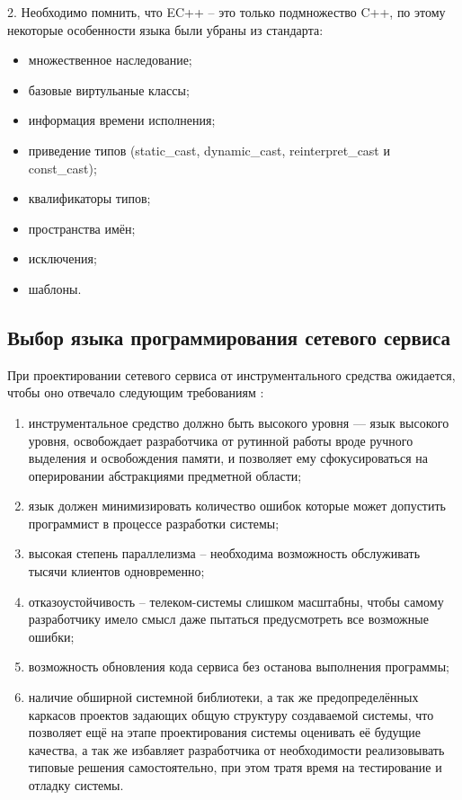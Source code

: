 \begin{par}
	2. Необходимо помнить, что EC++ -- это только подмножество C++, по этому некоторые особенности языка были
        убраны из стандарта:
        \begin{itemize}
            \item{} множественное наследование;
            \item{} базовые виртульаные классы;
            \item{} информация времени исполнения;
            \item{} приведение типов (static\_cast, dynamic\_cast, reinterpret\_cast и const\_cast);
            \item{} квалификаторы типов;
            \item{} пространства имён;
            \item{} исключения;
            \item{} шаблоны.
        \end{itemize}
\end{par}



\subsection{Выбор языка программирования сетевого сервиса}

При проектировании сетевого сервиса от инструментального средства ожидается, чтобы оно
отвечало следующим требованиям \cite{technob}:

\begin{enumerate}
	\item{} инструментальное средство должно быть высокого уровня --- язык высокого уровня,
            освобождает разработчика от рутинной работы вроде ручного выделения и освобождения
            памяти, и позволяет ему сфокусироваться на оперировании абстракциями предметной области;

	\item{} язык должен минимизировать количество ошибок которые может допустить программист в
             процессе разработки системы;

	\item{} высокая степень параллелизма -- необходима возможность обслуживать тысячи клиентов
            одновременно;
	
	\item{} отказоустойчивость -- телеком-системы слишком масштабны, чтобы самому разработчику
             имело смысл даже пытаться предусмотреть все возможные ошибки;
	
	\item{} возможность обновления кода сервиса без останова выполнения программы;
	
	\item{} наличие обширной системной библиотеки,  а так же предопределённых каркасов
            проектов задающих общую структуру создаваемой системы, что позволяет ещё
            на этапе проектирования системы оценивать её будущие качества, а так же избавляет разработчика
			от необходимости реализовывать типовые решения самостоятельно, при этом тратя время на
			тестирование и отладку системы.
\end{enumerate}

